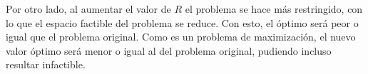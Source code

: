 Por otro lado, al aumentar el valor de $R$ el problema se hace más restringido, con lo que el espacio factible del problema se reduce. Con esto, el óptimo será peor o igual que el problema original. Como es un problema de maximización, el nuevo valor óptimo será menor o igual al del problema original, pudiendo incluso resultar infactible.